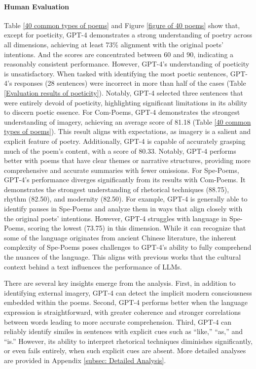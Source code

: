 \documentclass[11pt]{article}
\begin{document}
\paragraph{Human Evaluation}
Table \ref{40 common types of poems} and Figure \ref{figure of 40 poems} show that, except for poeticity, GPT-4 demonstrates a strong understanding of poetry across all dimensions, achieving at least 73\% alignment with the original poets' intentions. And the scores are concentrated between 60 and 90, indicating a reasonably consistent performance. However, GPT-4’s understanding of poeticity is unsatisfactory. When tasked with identifying the most poetic sentences, GPT-4’s responses (28 sentences) were incorrect in more than half of the cases (Table \ref{Evaluation results of poeticity}). Notably, GPT-4 selected three sentences that were entirely devoid of poeticity, highlighting significant limitations in its ability to discern poetic essence. For Com-Poems, GPT-4 demonstrates the strongest understanding of imagery, achieving an average score of 81.18 (Table \ref{40 common types of poems}). This result aligns with expectations, as imagery is a salient and explicit feature of poetry. Additionally, GPT-4 is capable of accurately grasping much of the poem’s content, with a score of 80.33. Notably, GPT-4 performs better with poems that have clear themes or narrative structures, providing more comprehensive and accurate summaries with fewer omissions. For Spe-Poems, GPT-4’s performance diverges significantly from its results with Com-Poems. It demonstrates the strongest understanding of rhetorical techniques (88.75), rhythm (82.50), and modernity (82.50). For example, GPT-4 is generally able to identify pauses in Spe-Poems and analyze them in ways that align closely with the original poets’ intentions. However, GPT-4 struggles with language in Spe-Poems, scoring the lowest (73.75) in this dimension. While it can recognize that some of the language originates from ancient Chinese literature, the inherent complexity of Spe-Poems poses challenges to GPT-4’s ability to fully comprehend the nuances of the language. This aligns with previous works \cite{lan2025mcbe, LyuBias, QiBias} that the cultural context behind a text influences the performance of LLMs. 

There are several key insights emerge from the analysis. First, in addition to identifying external imagery, GPT-4 can detect the implicit modern consciousness embedded within the poems. Second, GPT-4 performs better when the language expression is straightforward, with greater coherence and stronger correlations between words leading to more accurate comprehension. Third, GPT-4 can reliably identify similes in sentences with explicit cues such as ``like,'' ``as,'' and ``is.'' However, its ability to interpret rhetorical techniques diminishes significantly, or even fails entirely, when such explicit cues are absent. More detailed analyses are provided in Appendix \ref{subsec: Detailed Analysis}.
\end{document}
